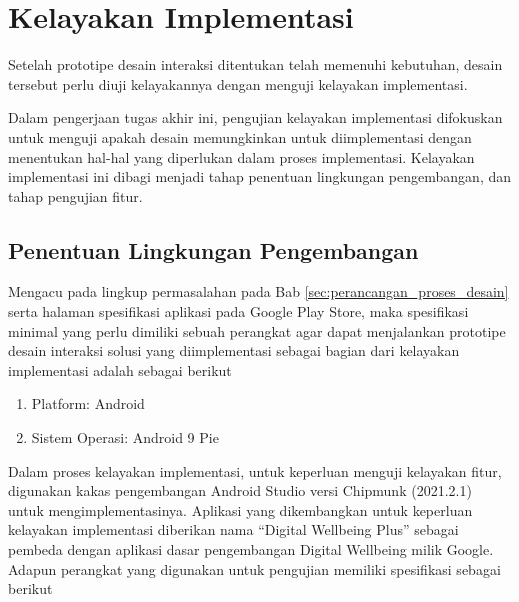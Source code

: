 \section{Kelayakan Implementasi}
\label{sec:kelayakan}

Setelah prototipe desain interaksi ditentukan telah memenuhi kebutuhan, desain tersebut perlu diuji kelayakannya dengan menguji kelayakan implementasi.

Dalam pengerjaan tugas akhir ini, pengujian kelayakan implementasi difokuskan untuk menguji apakah desain memungkinkan untuk diimplementasi dengan menentukan hal-hal yang diperlukan dalam proses implementasi. Kelayakan implementasi ini dibagi menjadi tahap penentuan lingkungan pengembangan, dan tahap pengujian fitur.

\subsection{Penentuan Lingkungan Pengembangan}

Mengacu pada lingkup permasalahan pada Bab \ref{sec:perancangan_proses_desain} serta halaman spesifikasi aplikasi pada Google Play Store, maka spesifikasi minimal yang perlu dimiliki sebuah perangkat agar dapat menjalankan prototipe desain interaksi solusi yang diimplementasi sebagai bagian dari kelayakan implementasi adalah sebagai berikut

\begin{enumerate}
  \item Platform: Android
  \item Sistem Operasi: Android 9 Pie
\end{enumerate}

Dalam proses kelayakan implementasi, untuk keperluan menguji kelayakan fitur, digunakan kakas pengembangan Android Studio versi Chipmunk (2021.2.1) untuk mengimplementasinya. Aplikasi yang dikembangkan untuk keperluan kelayakan implementasi diberikan nama “Digital Wellbeing Plus” sebagai pembeda dengan aplikasi dasar pengembangan Digital Wellbeing milik Google. Adapun perangkat yang digunakan untuk pengujian memiliki spesifikasi sebagai berikut

